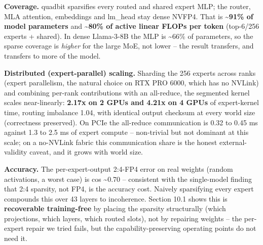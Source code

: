 \documentclass[
]{article}
\begin{document}
\textbf{Coverage.} quadbit sparsifies every routed and shared expert
MLP; the router, MLA attention, embeddings and lm\_head stay dense
NVFP4. That is \textbf{\textasciitilde91\% of model parameters} and
\textbf{\textasciitilde80\% of active linear FLOPs per token} (top-6/256
experts + shared). In dense Llama-3-8B the MLP is \textasciitilde66\% of
parameters, so the sparse coverage is \emph{higher} for the large MoE,
not lower -- the result transfers, and transfers to more of the model.

\textbf{Distributed (expert-parallel) scaling.} Sharding the 256 experts
across ranks (expert parallelism, the natural choice on RTX PRO 6000,
which has no NVLink) and combining per-rank contributions with an
all-reduce, the segmented kernel scales near-linearly: \textbf{2.17x on
2 GPUs and 4.21x on 4 GPUs} of expert-kernel time, routing imbalance
1.04, with identical output checksum at every world size (correctness
preserved). On PCIe the all-reduce communication is 0.32 to 0.45 ms
against 1.3 to 2.5 ms of expert compute -- non-trivial but not dominant
at this scale; on a no-NVLink fabric this communication share is the
honest external-validity caveat, and it grows with world size.

\textbf{Accuracy.} The per-expert-output 2:4-FP4 error on real weights
(random activations, a worst case) is cos \textasciitilde0.70 --
consistent with the single-model finding that 2:4 sparsity, not FP4, is
the accuracy cost. Naively sparsifying every expert compounds this over
43 layers to incoherence. Section 10.1 shows this is \textbf{recoverable
training-free} by placing the sparsity structurally (which projections,
which layers, which routed slots), not by repairing weights -- the
per-expert repair we tried fails, but the capability-preserving
operating points do not need it.
\end{document}
